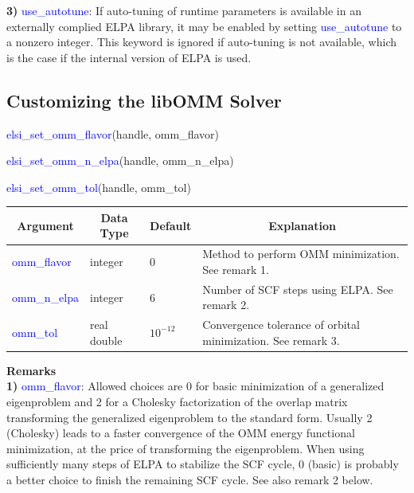 \documentclass{report}
\begin{document}
\textbf{3)} \textcolor{blue}{use\_autotune}:  If auto-tuning of runtime parameters is available in an externally complied ELPA library, it may be enabled by setting \textcolor{blue}{use\_autotune} to a nonzero integer.  This keyword is ignored if auto-tuning is not available, which is the case if the internal version of ELPA is used.\\

\subsection{Customizing the libOMM Solver}
\label{subsec:setter_omm}
\begin{labeling}{\hspace{6cm}}
\item [\hspace{0.3cm} \textcolor{blue}{elsi\_set\_omm\_flavor}(handle, omm\_flavor)]
\item [\hspace{0.3cm} \textcolor{blue}{elsi\_set\_omm\_n\_elpa}(handle, omm\_n\_elpa)]
\item [\hspace{0.3cm} \textcolor{blue}{elsi\_set\_omm\_tol}(handle, omm\_tol)]
\end{labeling}

\begin{tabular}[]{|p{30mm}|p{20mm}|p{15mm}|p{100mm}|}
\hline
\multicolumn{1}{|c|}{\textbf{Argument}} & \multicolumn{1}{c|}{\textbf{Data Type}} & \multicolumn{1}{c|}{\textbf{Default}} & \multicolumn{1}{c|}{\textbf{Explanation}}\\
\hline
\textcolor{blue}{omm\_flavor}  & integer     & 0          & Method to perform OMM minimization.  See remark 1.\\
\hline
\textcolor{blue}{omm\_n\_elpa} & integer     & 6          & Number of SCF steps using ELPA.  See remark 2.\\
\hline
\textcolor{blue}{omm\_tol}     & real double & $10^{-12}$ & Convergence tolerance of orbital minimization.  See remark 3.\\
\hline
\end{tabular}

\bigskip
\textbf{Remarks}\\

\textbf{1)} \textcolor{blue}{omm\_flavor}:  Allowed choices are 0 for basic minimization of a generalized eigenproblem and 2 for a Cholesky factorization of the overlap matrix transforming the generalized eigenproblem to the standard form.  Usually 2 (Cholesky) leads to a faster convergence of the OMM energy functional minimization, at the price of transforming the eigenproblem.  When using sufficiently many steps of ELPA to stabilize the SCF cycle, 0 (basic) is probably a better choice to finish the remaining SCF cycle.  See also remark 2 below.\\
\end{document}
